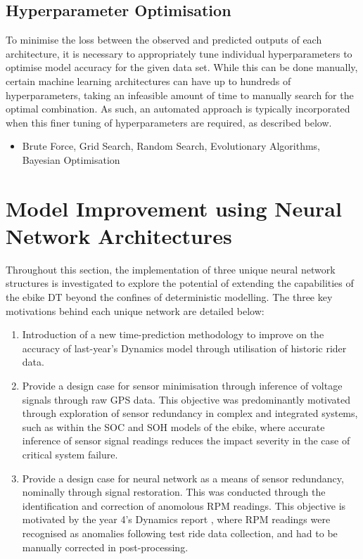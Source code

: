 \documentclass[a4paper, 10pt]{article}
\numberwithin{equation}{section}
\begin{document}


\subsection{Hyperparameter Optimisation} 
\label{sec:Hyperparameter_Optimisation}
To minimise the loss between the observed and predicted outputs of each architecture, it is necessary to appropriately tune individual hyperparameters to optimise model accuracy for the given data set. While this can be done manually, certain machine learning architectures can have up to hundreds of hyperparameters, taking an infeasible amount of time to manually search for the optimal combination. As such, an automated approach is typically incorporated when this finer tuning of hyperparameters are required, as described below.

\begin{itemize}
    \item Brute Force, Grid Search, Random Search, Evolutionary Algorithms, Bayesian Optimisation
\end{itemize}


\section{Model Improvement using Neural Network Architectures}
Throughout this section, the implementation of three unique neural network structures is investigated to explore the potential of extending the capabilities of the ebike DT beyond the confines of deterministic modelling. The three key motivations behind each unique network are detailed below:

\begin{enumerate}
    \item Introduction of a new time-prediction methodology to improve on the accuracy of last-year's Dynamics model through utilisation of historic rider data.
    \item Provide a design case for sensor minimisation through inference of voltage signals through raw GPS data. This objective was predominantly motivated through exploration of sensor redundancy in complex and integrated systems, such as within the SOC and SOH models of the ebike, where accurate inference of sensor signal readings reduces the impact severity in the case of critical system failure.
    \item Provide a design case for neural network as a means of sensor redundancy, nominally through signal restoration. This was conducted through the identification and correction of anomolous RPM readings. This objective is motivated by the year 4's Dynamics report \cite{report:dynamics}, where RPM readings were recognised as anomalies following test ride data collection, and had to be manually corrected in post-processing.
\end{enumerate}
\end{document}
